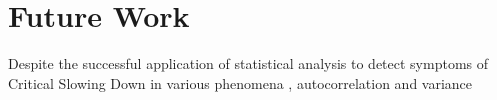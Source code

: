 \section[Future Work]{Future Work}
\label{sec:future}

Despite the successful application of statistical analysis to detect symptoms of Critical Slowing Down in various phenomena , autocorrelation and variance 
